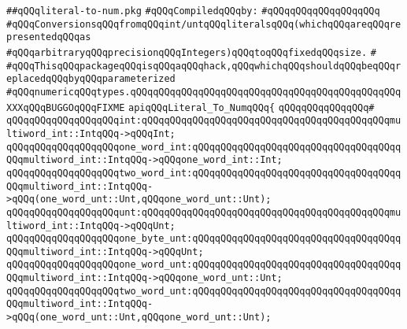 \label{src/lib/compiler/src/stuff/literal-to-num.pkg}
\verb|##qQQqliteral-to-num.pkg|\newline
\newline
\verb|#qQQqCompiledqQQqby:|\newline
\verb|#qQQqqQQqqQQqqQQqqQQq|\newline
\newline
\newline
\newline
\verb|#qQQqConversionsqQQqfromqQQqint/untqQQqliteralsqQQq(whichqQQqareqQQqrepresentedqQQqas|\newline
\verb|#qQQqarbitraryqQQqprecisionqQQqIntegers)qQQqtoqQQqfixedqQQqsize.|\newline
\verb|#|\newline
\verb|#qQQqThisqQQqpackageqQQqisqQQqaqQQqhack,qQQqwhichqQQqshouldqQQqbeqQQqreplacedqQQqbyqQQqparameterized|\newline
\verb|#qQQqnumericqQQqtypes.qQQqqQQqqQQqqQQqqQQqqQQqqQQqqQQqqQQqqQQqqQQqqQQqXXXqQQqBUGGOqQQqFIXME|\newline
\newline
\verb|apiqQQqLiteral_To_NumqQQq{|\newline
\verb|qQQqqQQqqQQqqQQq#|\newline
\verb|qQQqqQQqqQQqqQQqqQQqint:qQQqqQQqqQQqqQQqqQQqqQQqqQQqqQQqqQQqqQQqqQQqmultiword_int::IntqQQq->qQQqInt;|\newline
\verb|qQQqqQQqqQQqqQQqqQQqone_word_int:qQQqqQQqqQQqqQQqqQQqqQQqqQQqqQQqqQQqqQQqmultiword_int::IntqQQq->qQQqone_word_int::Int;|\newline
\verb|qQQqqQQqqQQqqQQqqQQqtwo_word_int:qQQqqQQqqQQqqQQqqQQqqQQqqQQqqQQqqQQqqQQqmultiword_int::IntqQQq->qQQq(one_word_unt::Unt,qQQqone_word_unt::Unt);|\newline
\verb|qQQqqQQqqQQqqQQqqQQqunt:qQQqqQQqqQQqqQQqqQQqqQQqqQQqqQQqqQQqqQQqqQQqmultiword_int::IntqQQq->qQQqUnt;|\newline
\verb|qQQqqQQqqQQqqQQqqQQqone_byte_unt:qQQqqQQqqQQqqQQqqQQqqQQqqQQqqQQqqQQqqQQqmultiword_int::IntqQQq->qQQqUnt;|\newline
\verb|qQQqqQQqqQQqqQQqqQQqone_word_unt:qQQqqQQqqQQqqQQqqQQqqQQqqQQqqQQqqQQqqQQqmultiword_int::IntqQQq->qQQqone_word_unt::Unt;|\newline
\verb|qQQqqQQqqQQqqQQqqQQqtwo_word_unt:qQQqqQQqqQQqqQQqqQQqqQQqqQQqqQQqqQQqqQQqmultiword_int::IntqQQq->qQQq(one_word_unt::Unt,qQQqone_word_unt::Unt);|\newline
